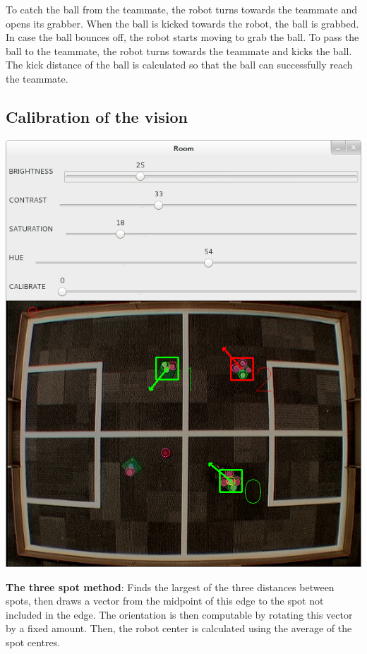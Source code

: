 \documentclass[a4paper,12pt]{article}
\begin{document}
To catch the ball from the teammate, the robot turns towards the teammate and opens its grabber. When the ball is kicked towards the robot, the ball is grabbed. In case the ball bounces off, the robot starts moving to grab the ball. To pass the ball to the teammate, the robot turns towards the teammate and kicks the ball. The kick distance of the ball is calculated so that the ball can successfully reach the teammate.

\subsection{Calibration of the vision} \label{calibration}

\begin{minipage}{0.6\textwidth}
\includegraphics[scale=0.3]{images/calibration1.png}
\end{minipage}
\begin{minipage}{0.4\textwidth}   
\textbf{The three spot method}: Finds the largest of the three distances between spots, then draws a vector from the midpoint of this edge to the spot not included in the edge. The orientation is then computable by rotating this vector by a fixed amount. Then, the robot center is calculated using the average of the spot centres.
\end{minipage}
\end{document}
